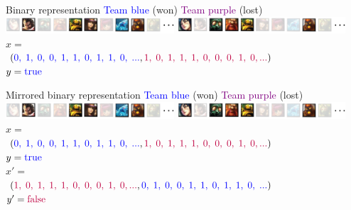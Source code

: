 \begin{frame}{Binary representation}
\centering
\textcolor{blue}{Team blue} (won) \hspace{40pt} \textcolor{purple}{Team purple} (lost)\\
\includegraphics[width=0.47\textwidth]{img/kent/pickblue.png}\hspace{2pt}%
\includegraphics[width=0.47\textwidth]{img/kent/pickpurple.png}\\
\vspace{18pt}
$x =$\\
\hspace{2pt} $(\textcolor{blue}{0,\;1,\;0,\;0,\;1,\;1,\;0,\;1,\;1,\;0,\;...},\textcolor{purple}{1,\;0,\;1,\;1,\;1,\;0,\;0,\;0,\;1,\;0,...})$\\
\vspace{18pt}
$y = \textcolor{blue}{\text{true}}$
\end{frame}

\begin{frame}{Mirrored binary representation}
\centering
\textcolor{blue}{Team blue} (won) \hspace{40pt} \textcolor{purple}{Team purple} (lost)\\
\includegraphics[width=0.47\textwidth]{img/kent/pickblue.png}\hspace{2pt}%
\includegraphics[width=0.47\textwidth]{img/kent/pickpurple.png}\\
\vspace{18pt}
$x =$\\
\hspace{2pt} $(\textcolor{blue}{0,\;1,\;0,\;0,\;1,\;1,\;0,\;1,\;1,\;0,\;...},\textcolor{purple}{1,\;0,\;1,\;1,\;1,\;0,\;0,\;0,\;1,\;0,...})$\\
$y = \textcolor{blue}{\text{true}}$\\
\vspace{18pt}
$x' =$\\
\hspace{2pt} $(\textcolor{purple}{1,\;0,\;1,\;1,\;1,\;0,\;0,\;0,\;1,\;0,...},\textcolor{blue}{0,\;1,\;0,\;0,\;1,\;1,\;0,\;1,\;1,\;0,\;...})$\\
$y' = \textcolor{purple}{\text{false}}$
\end{frame}

